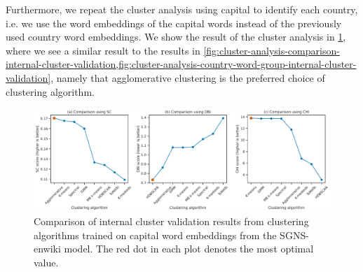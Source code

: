 Furthermore, we repeat the cluster analysis using capital to identify each country, i.e. we use the word embeddings of the capital words instead of the previously used country word embeddings. We show the result of the cluster analysis in \cref{fig:cluster-analysis-country-capitals-word-group-internal-cluster-validation}, where we see a similar result to the results in \cref{fig:cluster-analysis-comparison-internal-cluster-validation,fig:cluster-analysis-country-word-group-internal-cluster-validation}, namely that agglomerative clustering is the preferred choice of clustering algorithm.
\begin{figure}[H]
    \centering
    \includegraphics[width=\textwidth]{thesis/figures/cluster-analysis-country-capitals-word-group-internal-cluster-validation.pdf}
    \caption{Comparison of internal cluster validation results from clustering algorithms trained on capital word embeddings from the SGNS-enwiki model. The red dot in each plot denotes the most optimal value.}
    \label{fig:cluster-analysis-country-capitals-word-group-internal-cluster-validation}
\end{figure}

